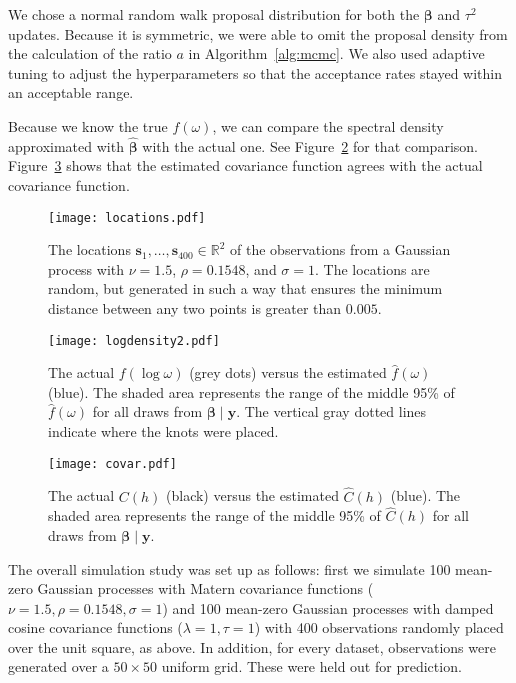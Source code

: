 We chose a normal random walk proposal distribution for both the $\bm{\beta}$ and $\tau^2$ updates. Because it is symmetric, we were able to omit the proposal density from the calculation of the ratio $a$ in Algorithm~\ref{alg:mcmc}. We also used adaptive tuning to adjust the hyperparameters so that the acceptance rates stayed within an acceptable range.

Because we know the true $f(\omega)$, we can compare the spectral density approximated with $\widehat{\bm{\beta}}$ with the actual one. See Figure~\ref{fig:result} for that comparison. Figure~\ref{fig:result-covar} shows that the estimated covariance function agrees with the actual covariance function.


\begin{figure}[!htb]
	\centering
	\texttt{[image: locations.pdf]}
	\caption{\small The locations $\bm{s}_1, \dots, \bm{s}_{400} \in \mathbb{R}^2$ of the observations from a Gaussian process with $\nu = 1.5$, $\rho = 0.1548$, and $\sigma = 1$. The locations are random, but generated in such a way that ensures the minimum distance between any two points is greater than $0.005$.}
	\label{fig:locations}
\end{figure}

\begin{figure}[!htb]
	\centering
	\texttt{[image: logdensity2.pdf]}
	\caption{\small The actual $f(\log \omega)$ (grey dots) versus the estimated $\hat{f}(\omega)$ (blue). The shaded area represents the range of the middle 95\% of $\hat{f}(\omega)$ for all draws from $\bm{\beta} \;|\; \bm{y}$. The vertical gray dotted lines indicate where the knots were placed.}
	\label{fig:result}
\end{figure}

\begin{figure}[!htb]
	\centering
	\texttt{[image: covar.pdf]}
	\caption{\small The actual $C(h)$ (black) versus the estimated $\widehat{C}(h)$ (blue). The shaded area represents the range of the middle 95\% of $\widehat{C}(h)$ for all draws from $\bm{\beta} \;|\; \bm{y}$.}
	\label{fig:result-covar}
\end{figure}

The overall simulation study was set up as follows: first we simulate 100 mean-zero Gaussian processes with Matern covariance functions ($\nu = 1.5, \rho = 0.1548, \sigma = 1$) and 100 mean-zero Gaussian processes with damped cosine covariance functions ($\lambda = 1, \tau = 1$) with 400 observations randomly placed over the unit square, as above. In addition, for every dataset, observations were generated over a $50\times50$ uniform grid. These were held out for prediction.


